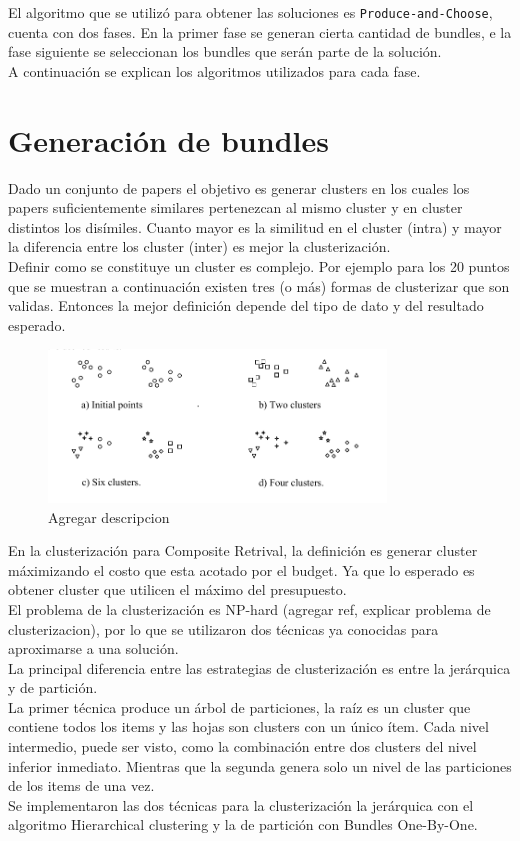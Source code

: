 El algoritmo que se utilizó para obtener las soluciones es \texttt{Produce-and-Choose}, cuenta con 
dos fases.
En la primer fase se generan cierta cantidad de bundles, e la fase siguiente se seleccionan los 
bundles que serán parte de la solución.\\
A continuación se explican los algoritmos utilizados para cada fase.
\section{Generación de bundles}
Dado un conjunto de papers el objetivo es generar clusters en los cuales los papers suficientemente 
similares pertenezcan al mismo cluster y en cluster distintos los disímiles. Cuanto mayor es la 
similitud en el cluster (intra) y mayor la diferencia entre los cluster (inter) es mejor la 
clusterización.\\
Definir como se constituye un cluster es complejo. Por ejemplo para los 20 puntos que se muestran a 
continuación existen tres (o más) formas de clusterizar que son validas. Entonces la mejor 
definición depende del tipo de dato y del resultado esperado.

\begin{figure}[H]
  \centering
    \includegraphics[width=0.8\textwidth]{img/howToCluster.png}
  \caption{Agregar descripcion}
  \label{res:img-howToCluster}
\end{figure}

En la clusterización para Composite Retrival, la definición es generar cluster máximizando el costo que esta acotado por el budget.
Ya que lo esperado es obtener cluster que utilicen el máximo del presupuesto.\\

El problema de la clusterización es NP-hard (agregar ref, explicar problema de clusterizacion),
por lo que se utilizaron dos técnicas ya conocidas para aproximarse a una solución.\\
La principal diferencia entre las estrategias de clusterización es entre la jerárquica y de 
partición.\\
La primer técnica produce un árbol de particiones, la raíz es un cluster que contiene todos los items
y las hojas son clusters con un único ítem. Cada nivel intermedio, puede ser visto, como la 
combinación entre dos clusters del nivel inferior inmediato. Mientras que la segunda genera solo un 
nivel de las particiones de los items de una vez.\\ 
Se implementaron las dos técnicas para la clusterización la jerárquica con el algoritmo
Hierarchical clustering y la de partición con Bundles One-By-One.\\

